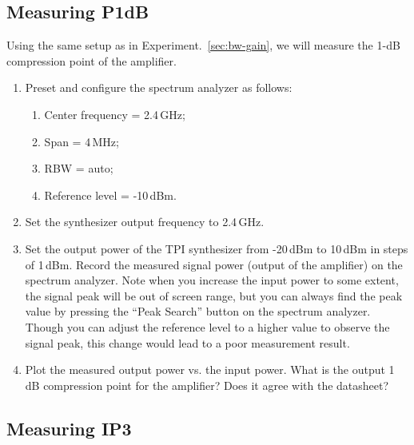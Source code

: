 \documentclass[letterpaper, 11pt]{article}
\begin{document}
\subsection{Measuring P1dB}
\label{sec:p1db}

Using the same setup as in Experiment.~\ref{sec:bw-gain}, we will measure the 1-dB compression point of the amplifier. 

\begin{enumerate}
	\item Preset and configure the spectrum analyzer as follows:
		\begin{enumerate}
			\item Center frequency = 2.4\,GHz;
			\item Span = 4\,MHz;
			\item RBW = auto;
			\item Reference level = -10\,dBm.
		\end{enumerate}
		
	\item Set the synthesizer output frequency to 2.4\,GHz.
	
	\item Set the output power of the TPI synthesizer from -20\,dBm to 10\,dBm in steps of 1\,dBm. Record the measured signal power (output of the amplifier) on the spectrum analyzer. Note when you increase the input power to some extent, the signal peak will be out of screen range, but you can always find the peak value by pressing the ``Peak Search'' button on the spectrum analyzer. Though you can adjust the reference level to a higher value to observe the signal peak, this change would lead to a poor measurement result.
	
	\item Plot the measured output power vs. the input power. What is the output 1\,dB compression point for the amplifier? Does it agree with the datasheet?
\end{enumerate}

\subsection{Measuring IP3}
\label{sec:ip3}
\end{document}
